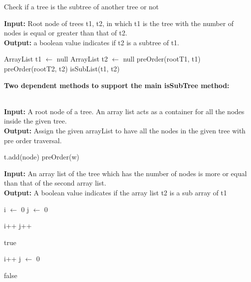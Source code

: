 \begin{algorithm}[H]
\caption{Check if a tree is the subtree of another tree or not}
\textbf{Input:} Root node of trees t1, t2, in which t1 is the tree with the number of nodes is equal or greater than that of t2.
\\
\textbf{Output:} a boolean value indicates if t2 is a subtree of t1.
\begin{algorithmic}[1]
\State ArrayList t1 $\leftarrow$ null
\State ArrayList t2 $\leftarrow$ null
\State preOrder(rootT1, t1)
\State preOrder(rootT2, t2)
\State \Return isSubList(t1, t2)
\EndProcedure
\end{algorithmic}
\end{algorithm}
\textbf{Two dependent methods to support the main isSubTree method:}
\\
\\
\begin{algorithm}[H]
\caption{}
\textbf{Input:} A root node of a tree. An array list acts as a container for all the nodes inside the given tree.
\\
\textbf{Output:} Assign the given arrayList to have all the nodes in the given tree with pre order traversal. 
\begin{algorithmic}[1]
\State t.add(node)
\State preOrder(w)
\EndFor
\EndProcedure
\end{algorithmic}
\end{algorithm}

\begin{algorithm}[H]
\caption{}
\textbf{Input:} An array list of the tree which has the number of nodes is more or equal than that of the second array list.
\\
\textbf{Output:} A boolean value indicates if the array list t2 is a sub array of t1
\begin{algorithmic}[1]
\State i $\leftarrow$ 0
\State j $\leftarrow$ 0

\State i++
\State j++

\Return true 
\EndIf

\Else
\State i++
\State j $\leftarrow$ 0
\EndIf

\EndWhile

\Return false
\EndProcedure
\end{algorithmic}
\end{algorithm}


